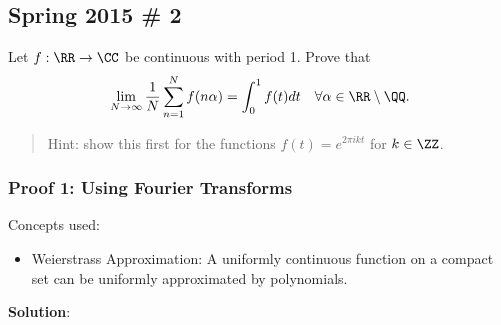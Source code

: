 \hypertarget{spring-2015-2}{%
\subsection{Spring 2015 \# 2}\label{spring-2015-2}}

Let \(f: \RR \to \CC\) be continuous with period 1. Prove that
\begin{align*}
\lim _{N \rightarrow \infty} \frac{1}{N} \sum_{n=1}^{N} f(n \alpha)=\int_{0}^{1} f(t) d t \quad \forall \alpha \in \RR\setminus\QQ.
\end{align*}

\begin{quote}
Hint: show this first for the functions \(f(t) = e^{2\pi i k t}\) for
\(k\in \ZZ\).
\end{quote}

\begin{solution}

\hypertarget{proof-1-using-fourier-transforms}{%
\subsubsection{Proof 1: Using Fourier
Transforms}\label{proof-1-using-fourier-transforms}}

Concepts used:

\begin{itemize}
\tightlist
\item
  Weierstrass Approximation: A uniformly continuous function on a
  compact set can be uniformly approximated by polynomials.
\end{itemize}

\textbf{Solution}:


\end{solution}
